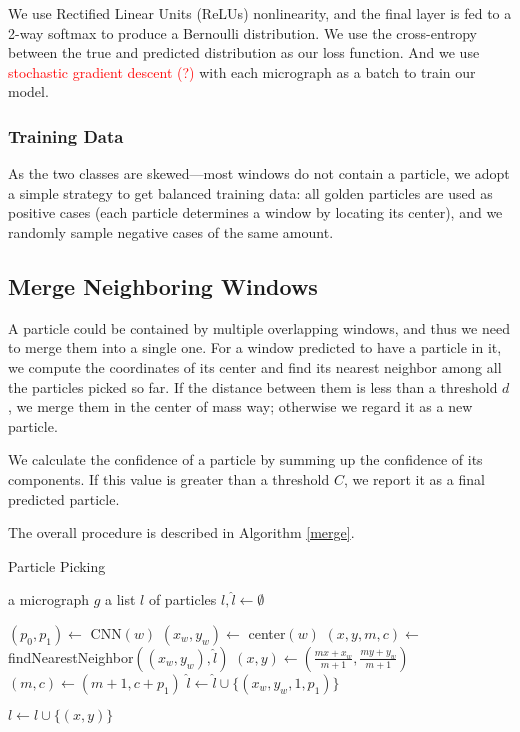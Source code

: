 \documentclass[11pt]{article}
\begin{document}
We use Rectified Linear Units (ReLUs) nonlinearity, and the final layer is fed to a 2-way softmax to produce a Bernoulli distribution. We use the cross-entropy between the true and predicted distribution as our loss function. And we use \textcolor{red}{stochastic gradient descent (?)} with each micrograph as a batch to train our model.

\subsubsection{Training Data}
As the two classes are skewed---most windows do not contain a particle, we adopt a simple strategy to get balanced training data: all golden particles are used as positive cases (each particle determines a window by locating its center), and we randomly sample negative cases of the same amount.

\subsection{Merge Neighboring Windows}
A particle could be contained by multiple overlapping windows, and thus we need to merge them into a single one. For a window predicted to have a particle in it, we compute the coordinates of its center and find its nearest neighbor among all the particles picked so far. If the distance between them is less than a threshold $d$, we merge them in the center of mass way; otherwise we regard it as a new particle.

We calculate the confidence of a particle by summing up the confidence of its components. If this value is greater than a threshold $C$, we report it as a final predicted particle.

The overall procedure is described in Algorithm \ref{merge}.

\begin{algorithm}
\caption{Particle Picking}\label{merge}
\begin{algorithmic}[1]
\REQUIRE a micrograph $g$
\ENSURE a list $l$ of particles
\STATE $l,\hat l\leftarrow\emptyset$

    \STATE $(p_0, p_1)\leftarrow$ CNN$(w)$
        \STATE $(x_w,y_w)\leftarrow$ center$(w)$
        \STATE $(x,y,m,c)\leftarrow$ findNearestNeighbor$((x_w,y_w),\hat l)$
            \STATE $(x,y)\leftarrow (\frac{mx+x_w}{m+1}, \frac{my+y_w}{m+1})$
            \STATE $(m,c)\leftarrow (m+1,c+p_1)$
        \ELSE
            \STATE $\hat l\leftarrow \hat l\cup\{(x_w,y_w,1,p_1)\}$
        \ENDIF
    \ENDIF
\ENDFOR

        \STATE $l\leftarrow l\cup\{(x,y)\}$
    \ENDIF
\ENDFOR
\end{algorithmic}
\end{algorithm}
\end{document}
